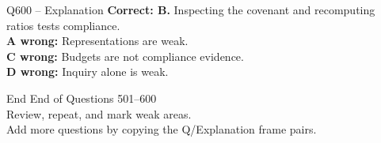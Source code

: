 \documentclass[aspectratio=169,10pt]{beamer}
\begin{document}
	\begin{frame}[t]{Q600 -- Explanation}
		\small
		\textbf{Correct: B.} Inspecting the covenant and recomputing ratios tests compliance. \\[4pt]
		\textbf{A wrong:} Representations are weak. \\[2pt]
		\textbf{C wrong:} Budgets are not compliance evidence. \\[2pt]
		\textbf{D wrong:} Inquiry alone is weak.
	\end{frame}
	
	\begin{frame}{End}
		\centering
		\Large End of Questions 501--600\\[8pt]
		\normalsize Review, repeat, and mark weak areas.\\[4pt]
		\small Add more questions by copying the Q/Explanation frame pairs.
	\end{frame}
	
\end{document}
